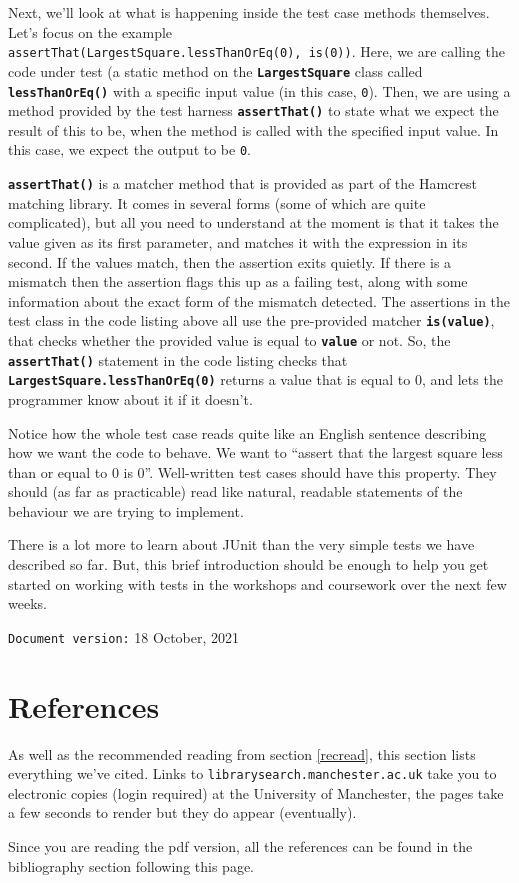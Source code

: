 \documentclass[
]{book}
\begin{document}
Next, we'll look at what is happening inside the test case methods themselves. Let's focus on the example \texttt{assertThat(LargestSquare.lessThanOrEq(0),\ is(0))}. Here, we are calling the code under test (a static method on the \textbf{\texttt{LargestSquare}} class called \textbf{\texttt{lessThanOrEq()}} with a specific input value (in this case, \texttt{0}). Then, we are using a method provided by the test harness \textbf{\texttt{assertThat()}} to state what we expect the result of this to be, when the method is called with the specified input value. In this case, we expect the output to be \texttt{0}.

\textbf{\texttt{assertThat()}} is a matcher method that is provided as part of the Hamcrest matching library. It comes in several forms (some of which are quite complicated), but all you need to understand at the moment is that it takes the value given as its first parameter, and matches it with the expression in its second. If the values match, then the assertion exits quietly. If there is a mismatch then the assertion flags this up as a failing test, along with some information about the exact form of the mismatch detected. The assertions in the test class in the code listing above all use the pre-provided matcher \textbf{\texttt{is(value)}}, that checks whether the provided value is equal to \textbf{\texttt{value}} or not. So, the \textbf{\texttt{assertThat()}} statement in the code listing checks that \textbf{\texttt{LargestSquare.lessThanOrEq(0)}} returns a value that is equal to 0, and lets the programmer know about it if it doesn't.

Notice how the whole test case reads quite like an English sentence describing how we want the code to behave. We want to ``assert that the largest square less than or equal to 0 is 0''. Well-written test cases should have this property. They should (as far as practicable) read like natural, readable statements of the behaviour we are trying to implement.

There is a lot more to learn about JUnit than the very simple tests we have described so far. But, this brief introduction should be enough to help you get started on working with tests in the workshops and coursework over the next few weeks.

\texttt{Document\ version:} 18 October, 2021

\hypertarget{reading}{%
\chapter{References}\label{reading}}

As well as the recommended reading from section \ref{recread}, this section lists everything we've cited. Links to \texttt{librarysearch.manchester.ac.uk} take you to electronic copies (login required) at the University of Manchester, the pages take a few seconds to render but they do appear (eventually).

Since you are reading the pdf version, all the references can be found in the bibliography section following this page.

  
\end{document}
